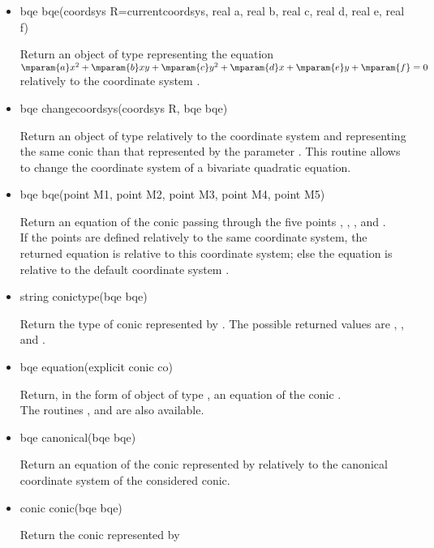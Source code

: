 \documentclass[pdftex]{article}
\begin{document}
\begin{itemize}
\item {}
  \begin{Vcolor}
    bqe bqe(coordsys R=currentcoordsys, real a, real b, real c, real d, real e, real f)
  \end{Vcolor}
  Return an object of type  representing the equation
  $\mparam{a}x^2 + \mparam{b}xy + \mparam{c}y^2 + \mparam{d}x + \mparam{e}y + \mparam{f}=0$
  relatively to the coordinate system .
\item {}
  \begin{Vcolor}
    bqe changecoordsys(coordsys R, bqe bqe)
  \end{Vcolor}
  Return an object of type  relatively to the coordinate
  system  and representing the same conic than that
  represented by the parameter . This routine allows to
  change the coordinate system of a bivariate quadratic equation.
\item {}
  \begin{Vcolor}
    bqe bqe(point M1, point M2, point M3, point M4, point M5)
  \end{Vcolor}
  Return an equation of the conic passing through the five
  points , , , 
  and .\\
  If the points are defined relatively to the same coordinate system,
  the returned equation is relative to this coordinate system; else
  the equation is relative to the default coordinate system
  .
\item {}
  \begin{Vcolor}
    string conictype(bqe bqe)
  \end{Vcolor}
  Return the type of conic represented by . The possible
  returned values are , , 
  and .
\item {}
  \begin{Vcolor}
    bqe equation(explicit conic co)
  \end{Vcolor}
  Return, in the form of object of type , an equation of the
  conic .\\
  The routines ,  and
   are also available.
\item {}
  \begin{Vcolor}
    bqe canonical(bqe bqe)
  \end{Vcolor}
  Return an equation of the conic represented by 
  relatively to the canonical coordinate system of the considered conic.
\item {}
  \begin{Vcolor}
    conic conic(bqe bqe)
  \end{Vcolor}
  Return the conic represented by 
\end{itemize}
\end{document}
